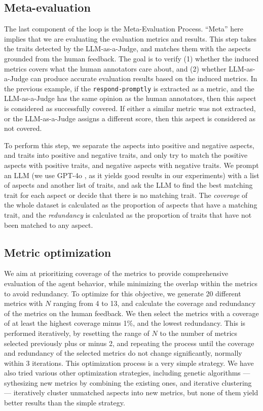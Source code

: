\subsection{Meta-evaluation}
\label{sec:meta-evaluation}

The last component of the loop is the Meta-Evaluation Process. ``Meta'' here implies 
that we are evaluating the evaluation metrics and results. 
This step takes the traits detected by the LLM-as-a-Judge, and matches them with the aspects
grounded from the human feedback. The goal is to verify (1) whether the induced metrics 
covers what the human annotators care about, and (2) whether LLM-as-a-Judge can produce
accurate evaluation results based on the induced metrics. In the previous example,
if the \texttt{respond-promptly} is extracted as a metric, and the LLM-as-a-Judge
has the same opinion as the human annotators, then this aspect is considered as successfully covered.
If either a similar metric was not extracted, or the LLM-as-a-Judge assigns a different score,
then this aspect is considered as not covered.

To perform this step, we separate the aspects into positive and negative aspects, and
traits into positive and negative traits, and only try to match the positive aspects with positive traits,
and negative aspects with negative traits. 
We prompt an LLM (we use GPT-4o \citep{openai2024gpt4ocard},
as it yields good results in our experiments) with a list of aspects and another list of traits,
and ask the LLM to find the best matching trait for each aspect or decide that there is no matching trait.
The \emph{coverage} of the whole dataset is calculated as the proportion of aspects that have a matching trait,
and the \emph{redundancy} is calculated as the proportion of traits that have not been matched to any aspect.


\subsection{Metric optimization}
\label{sec:metric-optimization}
We aim at prioritizing coverage of the metrics to provide comprehensive evaluation of the agent behavior,
while minimizing the overlap within the metrics to avoid redundancy.
To optimize for this objective, we generate 20 different metrics with $N$ ranging from 4 to 13,
and calculate the coverage and redundancy of the metrics on the human feedback.
We then select the metrics with a coverage of at least the highest coverage minus 1\%,
and the lowest redundancy.
This is performed iteratively, by resetting the range of $N$ to the number of metrics selected
previously plus or minus 2, and repeating the process until the coverage and redundancy
of the selected metrics do not change significantly, normally within 3 iterations.
This optimization process is a very simple strategy. We have also tried various other optimization
strategies, including genetic algorithms --- sythesizing new metrics by combining the existing ones,
and iterative clustering --- iteratively cluster unmatched aspects into new metrics, but none of them
yield better results than the simple strategy.


